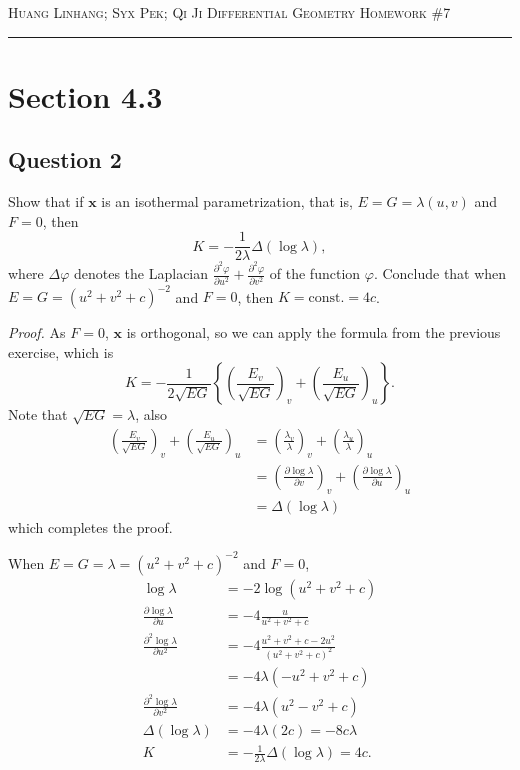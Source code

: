 \documentclass[12pt]{article}
\begin{document}
\thispagestyle{empty}

{\scshape Huang Linhang; Syx Pek; Qi Ji} \hfill {\scshape \large Differential Geometry} \hfill {\scshape Homework \#7}
 
\smallskip
\hrule
\bigskip

\section*{Section 4.3}
\subsection*{Question 2}

\newcommand*{\pdd}[2]{\frac{\partial #1}{\partial #2}}
\let\phi\varphi

Show that if \(\mathbf{x}\) is an isothermal parametrization, that is,
\(E = G = \lambda(u,v)\) and \(F = 0\), then
\[ K = -\frac{1}{2\lambda}\Delta(\log\lambda), \]
where \(\Delta\phi\) denotes the Laplacian
\(\pdd{^2\phi}{u^2} + \pdd{^2\phi}{v^2}\) of the function \(\phi\).
Conclude that when \(E = G = (u^2+v^2+c)^{-2}\) and \(F = 0\), then \(K = \text{const.} = 4c\).

\emph{Proof.}
As \(F = 0\), \(\mathbf{x}\) is orthogonal, so we can apply the formula from the previous exercise, which is
\[ K = -\frac{1}{2\sqrt{EG}} \left\{
        \left( \frac{E_v}{\sqrt{EG}} \right)_v +
        \left( \frac{E_u}{\sqrt{EG}} \right)_u
\right\}. \]
Note that \(\sqrt{EG} = \lambda\), also
\begin{align*}
    \left( \frac{E_v}{\sqrt{EG}} \right)_v + \left( \frac{E_u}{\sqrt{EG}} \right)_u
    &= \left( \frac{\lambda_v}{\lambda} \right)_v + \left( \frac{\lambda_u}{\lambda} \right)_u \\
    &= \left( \pdd{\log\lambda}{v} \right)_v + \left( \pdd{\log\lambda}{u} \right)_u \\
    &= \Delta(\log \lambda)
\end{align*}
which completes the proof.

When \(E = G = \lambda = (u^2+v^2+c)^{-2}\) and \(F = 0\),
\begin{align*}
    \log\lambda &= -2 \log (u^2+v^2+c) \\
    \pdd{\log\lambda}{u} &= -4 \frac{u}{u^2+v^2+c} \\
    \pdd{^2\log\lambda}{u^2} &= -4 \frac{u^2 + v^2 + c - 2u^2}{(u^2+v^2+c)^2} \\
                             &= -4\lambda (-u^2 + v^2 + c) \\
    \pdd{^2\log\lambda}{v^2} &= -4\lambda ( u^2 - v^2 + c) \\
    \Delta(\log\lambda) &= -4\lambda(2c) = -8c\lambda \\
    K &= -\frac{1}{2\lambda}\Delta(\log\lambda) = 4c.
\end{align*}
\end{document}

